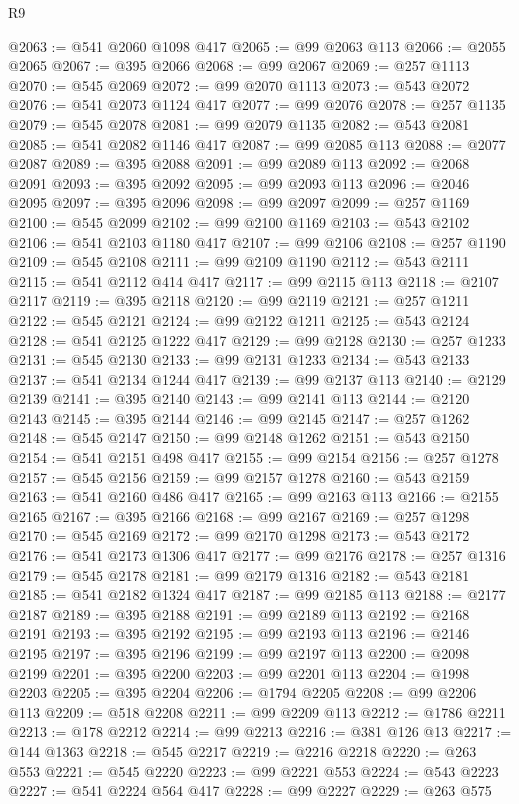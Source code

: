 \begin{lexlean}{R9}
\begin{coremodule}
{{{{{{{{{{{{{{{{{{{{{{{{{{{{{{{{{{{{{{{{{{{{{{{{{{{{{{{{{{{{{{{{{{{{{{{{{{{{{{{{{{{{@2063 := @541 @2060 @1098 @417
@2065 := @99 @2063 @113
@2066 := @2055 @2065
@2067 := @395 @2066
@2068 := @99 @2067
@2069 := @257 @1113
@2070 := @545 @2069
@2072 := @99 @2070 @1113
@2073 := @543 @2072
@2076 := @541 @2073 @1124 @417
@2077 := @99 @2076
@2078 := @257 @1135
@2079 := @545 @2078
@2081 := @99 @2079 @1135
@2082 := @543 @2081
@2085 := @541 @2082 @1146 @417
@2087 := @99 @2085 @113
@2088 := @2077 @2087
@2089 := @395 @2088
@2091 := @99 @2089 @113
@2092 := @2068 @2091
@2093 := @395 @2092
@2095 := @99 @2093 @113
@2096 := @2046 @2095
@2097 := @395 @2096
@2098 := @99 @2097
@2099 := @257 @1169
@2100 := @545 @2099
@2102 := @99 @2100 @1169
@2103 := @543 @2102
@2106 := @541 @2103 @1180 @417
@2107 := @99 @2106
@2108 := @257 @1190
@2109 := @545 @2108
@2111 := @99 @2109 @1190
@2112 := @543 @2111
@2115 := @541 @2112 @414 @417
@2117 := @99 @2115 @113
@2118 := @2107 @2117
@2119 := @395 @2118
@2120 := @99 @2119
@2121 := @257 @1211
@2122 := @545 @2121
@2124 := @99 @2122 @1211
@2125 := @543 @2124
@2128 := @541 @2125 @1222 @417
@2129 := @99 @2128
@2130 := @257 @1233
@2131 := @545 @2130
@2133 := @99 @2131 @1233
@2134 := @543 @2133
@2137 := @541 @2134 @1244 @417
@2139 := @99 @2137 @113
@2140 := @2129 @2139
@2141 := @395 @2140
@2143 := @99 @2141 @113
@2144 := @2120 @2143
@2145 := @395 @2144
@2146 := @99 @2145
@2147 := @257 @1262
@2148 := @545 @2147
@2150 := @99 @2148 @1262
@2151 := @543 @2150
@2154 := @541 @2151 @498 @417
@2155 := @99 @2154
@2156 := @257 @1278
@2157 := @545 @2156
@2159 := @99 @2157 @1278
@2160 := @543 @2159
@2163 := @541 @2160 @486 @417
@2165 := @99 @2163 @113
@2166 := @2155 @2165
@2167 := @395 @2166
@2168 := @99 @2167
@2169 := @257 @1298
@2170 := @545 @2169
@2172 := @99 @2170 @1298
@2173 := @543 @2172
@2176 := @541 @2173 @1306 @417
@2177 := @99 @2176
@2178 := @257 @1316
@2179 := @545 @2178
@2181 := @99 @2179 @1316
@2182 := @543 @2181
@2185 := @541 @2182 @1324 @417
@2187 := @99 @2185 @113
@2188 := @2177 @2187
@2189 := @395 @2188
@2191 := @99 @2189 @113
@2192 := @2168 @2191
@2193 := @395 @2192
@2195 := @99 @2193 @113
@2196 := @2146 @2195
@2197 := @395 @2196
@2199 := @99 @2197 @113
@2200 := @2098 @2199
@2201 := @395 @2200
@2203 := @99 @2201 @113
@2204 := @1998 @2203
@2205 := @395 @2204
@2206 := @1794 @2205
@2208 := @99 @2206 @113
@2209 := @518 @2208
@2211 := @99 @2209 @113
@2212 := @1786 @2211
@2213 := @178 @2212
@2214 := @99 @2213
@2216 := @381 @126 @13
@2217 := @144 @1363
@2218 := @545 @2217
@2219 := @2216 @2218
@2220 := @263 @553
@2221 := @545 @2220
@2223 := @99 @2221 @553
@2224 := @543 @2223
@2227 := @541 @2224 @564 @417
@2228 := @99 @2227
@2229 := @263 @575
}}}}}}}}}}}}}}}}}}}}}}}}}}}}}}}}}}}}}}}}}}}}}}}}}}}}}}}}}}}}}}}}}}}}}}}}}}}}}}}}}}}}
\end{coremodule}
\end{lexlean}
